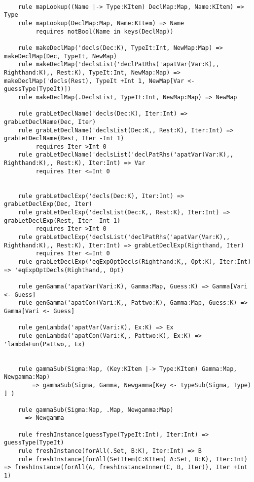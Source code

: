 \begin{lstlisting}

    rule mapLookup((Name |-> Type:KItem) DeclMap:Map, Name:KItem) => Type
    rule mapLookup(DeclMap:Map, Name:KItem) => Name
         requires notBool(Name in keys(DeclMap))

    rule makeDeclMap('decls(Dec:K), TypeIt:Int, NewMap:Map) => makeDeclMap(Dec, TypeIt, NewMap)
    rule makeDeclMap('declsList('declPatRhs('apatVar(Var:K),, Righthand:K),, Rest:K), TypeIt:Int, NewMap:Map) => makeDeclMap('decls(Rest), TypeIt +Int 1, NewMap[Var <- guessType(TypeIt)])
    rule makeDeclMap(.DeclsList, TypeIt:Int, NewMap:Map) => NewMap

    rule grabLetDeclName('decls(Dec:K), Iter:Int) => grabLetDeclName(Dec, Iter)
    rule grabLetDeclName('declsList(Dec:K,, Rest:K), Iter:Int) => grabLetDeclName(Rest, Iter -Int 1)
         requires Iter >Int 0
    rule grabLetDeclName('declsList('declPatRhs('apatVar(Var:K),, Righthand:K),, Rest:K), Iter:Int) => Var
         requires Iter <=Int 0


    rule grabLetDeclExp('decls(Dec:K), Iter:Int) => grabLetDeclExp(Dec, Iter)
    rule grabLetDeclExp('declsList(Dec:K,, Rest:K), Iter:Int) => grabLetDeclExp(Rest, Iter -Int 1)
         requires Iter >Int 0
    rule grabLetDeclExp('declsList('declPatRhs('apatVar(Var:K),, Righthand:K),, Rest:K), Iter:Int) => grabLetDeclExp(Righthand, Iter)
         requires Iter <=Int 0
    rule grabLetDeclExp('eqExpOptDecls(Righthand:K,, Opt:K), Iter:Int) => 'eqExpOptDecls(Righthand,, Opt)

    rule genGamma('apatVar(Vari:K), Gamma:Map, Guess:K) => Gamma[Vari <- Guess]
    rule genGamma('apatCon(Vari:K,, Pattwo:K), Gamma:Map, Guess:K) => Gamma[Vari <- Guess]

    rule genLambda('apatVar(Vari:K), Ex:K) => Ex
    rule genLambda('apatCon(Vari:K,, Pattwo:K), Ex:K) => 'lambdaFun(Pattwo,, Ex)


    rule gammaSub(Sigma:Map, (Key:KItem |-> Type:KItem) Gamma:Map, Newgamma:Map)
        => gammaSub(Sigma, Gamma, Newgamma[Key <- typeSub(Sigma, Type) ] )

    rule gammaSub(Sigma:Map, .Map, Newgamma:Map)
      => Newgamma

    rule freshInstance(guessType(TypeIt:Int), Iter:Int) => guessType(TypeIt)
    rule freshInstance(forAll(.Set, B:K), Iter:Int) => B
    rule freshInstance(forAll(SetItem(C:KItem) A:Set, B:K), Iter:Int) => freshInstance(forAll(A, freshInstanceInner(C, B, Iter)), Iter +Int 1)


\end{lstlisting}
